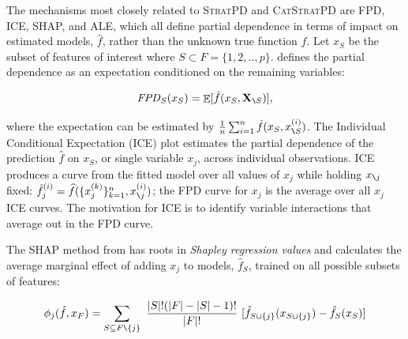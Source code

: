 \documentclass[]{article} %
\newcommand{\spd}{\fontfamily{cmr}\textsc{\small StratPD}}
\newcommand{\cspd}{\fontfamily{cmr}\textsc{\small CatStratPD}}
\newcommand{\xnj}{$x_{\texttt{\char`\\} j}$}
\renewcommand{\slash}{\texttt{\char`\\}}
\DeclareMathOperator{\Ex}{\mathbb{E}}
\begin{document}
The mechanisms most closely related to \spd{} and \cspd{} are FPD, ICE, SHAP, and ALE, which all define partial dependence in terms of impact on estimated models, $\hat{f}$, rather than the unknown true function $f$. Let $x_S$ be the subset of features of interest where $S \subset F = \{1, 2, .., p\}$. \citet{PDP} defines the partial dependence as an expectation conditioned on the remaining variables:\vspace{-2mm}

\begin{equation}
{\it FPD}_S(x_S) = \Ex[\hat{f}(x_S,{\bf X}_{\slash S})],
\end{equation}\vspace{-3mm}

\noindent where the expectation can be estimated by $\frac{1}{n} \sum_{i=1}^n \hat{f}(x_S, x_{\slash S}^{(i)})$.
The Individual Conditional Expectation (ICE) plot \citep{ICE} estimates the partial dependence of the prediction $\hat{f}$ on $x_S$, or single variable $x_j$, across individual observations. ICE produces a curve from the fitted model over all values of $x_j$ while holding \xnj{} fixed: $\hat{f}^{(i)}_j = \widehat{f}(\{x_j^{(k)}\}_{k = 1}^n, x_{\slash j}^{(i)})$;  the FPD curve for  $x_j$ is the average over all $x_j$ ICE curves. The motivation for ICE is to identify variable interactions that average out in the FPD curve. 


The SHAP method from \citet{shap} has roots in {\em Shapley regression values} \citep{shapley-regression} and calculates the average marginal effect of adding $x_j$ to models, $\hat{f}_S$, trained on all possible subsets of features:
\vspace{-1mm}

\begin{equation}\label{eq:shap}
\phi_j(\hat{f},x_F) = \sum_{S \subseteq F \slash \{j\}}\
\frac{|S|!(|F|-|S|-1)!}{|F|!}\
 [ \hat{f}_{S \cup \{j\}}(x_{S \cup \{j\}}) - \hat{f}_S(x_S) ]
\end{equation}\vspace{-1mm}
\end{document}
